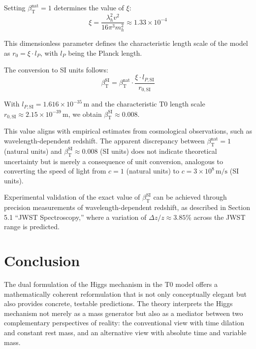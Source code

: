 \documentclass[a4paper,12pt]{article}
\newcommand{\betaT}{\beta_{\text{T}}}
\begin{document}
	Setting \(\betaT^{\text{nat}} = 1\) determines the value of \(\xi\):
	\begin{equation}
		\xi = \frac{\lambda_h^2 v^2}{16\pi^3 m_h^2} \approx 1.33 \times 10^{-4}
	\end{equation}
	
	This dimensionless parameter defines the characteristic length scale of the model as \(r_0 = \xi \cdot l_P\), with \(l_P\) being the Planck length.
	
	The conversion to SI units follows:
	\begin{equation}
		\betaT^{\text{SI}} = \betaT^{\text{nat}} \cdot \frac{\xi \cdot l_{P,\text{SI}}}{r_{0,\text{SI}}}
	\end{equation}
	
	With \(l_{P,\text{SI}} = 1.616 \times 10^{-35} \, \text{m}\) and the characteristic T0 length scale \(r_{0,\text{SI}} \approx 2.15 \times 10^{-39} \, \text{m}\), we obtain \(\betaT^{\text{SI}} \approx 0.008\).
	
	This value aligns with empirical estimates from cosmological observations, such as wavelength-dependent redshift. The apparent discrepancy between \(\betaT^{\text{nat}} = 1\) (natural units) and \(\betaT^{\text{SI}} \approx 0.008\) (SI units) does not indicate theoretical uncertainty but is merely a consequence of unit conversion, analogous to converting the speed of light from \(c = 1\) (natural units) to \(c = 3 \times 10^8 \, \text{m/s}\) (SI units).
	
	Experimental validation of the exact value of \(\betaT^{\text{SI}}\) can be achieved through precision measurements of wavelength-dependent redshift, as described in Section 5.1 ``JWST Spectroscopy,'' where a variation of \(\Delta z / z \approx 3.85\%\) across the JWST range is predicted.
	
	\section{Conclusion}
	The dual formulation of the Higgs mechanism in the T0 model offers a mathematically coherent reformulation that is not only conceptually elegant but also provides concrete, testable predictions. The theory interprets the Higgs mechanism not merely as a mass generator but also as a mediator between two complementary perspectives of reality: the conventional view with time dilation and constant rest mass, and an alternative view with absolute time and variable mass.
	
\end{document}
